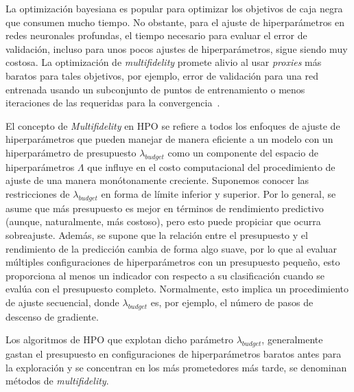 La optimización bayesiana es popular para optimizar los objetivos de caja negra que consumen mucho tiempo. No obstante, para el ajuste de hiperparámetros en redes neuronales profundas, el tiempo necesario para evaluar el error de validación, incluso para unos pocos ajustes de hiperparámetros, sigue siendo muy costosa. La optimización de \textit{multifidelity} promete alivio al usar \emph{proxies} más baratos para tales objetivos, por ejemplo, error de validación para una red entrenada usando un subconjunto de puntos de entrenamiento o menos iteraciones de las requeridas para la convergencia~\cite{wu2019practical}.

El concepto de \textit{Multifidelity} en HPO se refiere a todos los enfoques de ajuste de hiperparámetros que pueden manejar de manera eficiente a un modelo con un hiperparámetro de presupuesto $\lambda_{budget}$ como un componente del espacio de hiperparámetros $\Lambda$ que influye en el costo computacional del procedimiento de ajuste de una manera monótonamente creciente. Suponemos conocer las restricciones de $\lambda_{budget}$ en forma de límite inferior y superior. Por lo general, se asume que más presupuesto es mejor en términos de rendimiento predictivo (aunque, naturalmente, más costoso), pero esto puede propiciar que ocurra sobreajuste. Además, se supone que la relación entre el presupuesto y el rendimiento de la predicción cambia de forma algo suave, por lo que al evaluar múltiples configuraciones de hiperparámetros con un presupuesto pequeño, esto proporciona al menos un indicador con respecto a su clasificación cuando se evalúa con el presupuesto completo. Normalmente, esto implica un procedimiento de ajuste secuencial, donde $\lambda_{budget}$ es, por ejemplo,  el número de pasos de descenso de gradiente. %

Los algoritmos de HPO que explotan dicho parámetro $\lambda_{budget}$, generalmente gastan el presupuesto en configuraciones de hiperparámetros baratos antes para la exploración y se concentran	 en los más prometedores más tarde, se denominan métodos de \textit{multifidelity}.

